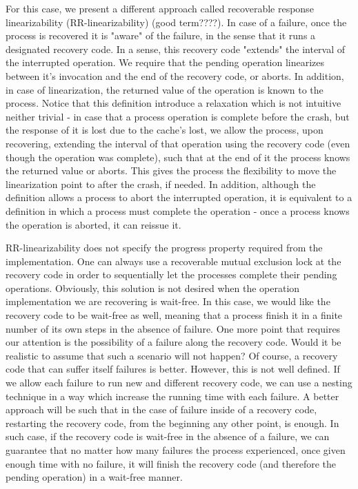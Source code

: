 \documentclass{article}
\begin{document}
For this case, we present a different approach called recoverable response linearizability (RR-linearizability) (good term????). In case of a failure, once the process is recovered it is "aware" of the failure, in the sense that it runs a designated recovery code. In a sense, this recovery code "extends" the interval of the interrupted operation. We require that the pending operation linearizes between it's invocation and the end of the recovery code, or aborts. In addition, in case of linearization, the returned value of the operation is known to the process. Notice that this definition introduce a relaxation which is not intuitive neither trivial - in case that a process operation is complete before the crash, but the response of it is lost due to the cache's lost, we allow the process, upon recovering, extending the interval of that operation using the recovery code (even though the operation was complete), such that at the end of it the process knows the returned value or aborts. This gives the process the flexibility to move the linearization point to after the crash, if needed. In addition, although the definition allows a process to abort the interrupted operation, it is equivalent to a definition in which a process must complete the operation - once a process knows the operation is aborted, it can reissue it.

RR-linearizability does not specify the progress property required from the implementation. One can always use a recoverable mutual exclusion lock at the recovery code in order to sequentially let the processes complete their pending operations. Obviously, this solution is not desired when the operation implementation we are recovering is wait-free. In this case, we would like the recovery code to be wait-free as well, meaning that a process finish it in a finite number of its own steps in the absence of failure. One more point that requires our attention is the possibility of a failure along the recovery code. Would it be realistic to assume that such a scenario will not happen? Of course, a recovery code that can suffer itself failures is better. However, this is not well defined. If we allow each failure to run new and different recovery code, we can use a nesting technique in a way which increase the running time with each failure. A better approach will be such that in the case of failure inside of a recovery code, restarting the recovery code, from the beginning any other point, is enough. In such case, if the recovery code is wait-free in the absence of a failure, we can guarantee that no matter how many failures the process experienced, once given enough time with no failure, it will finish the recovery code (and therefore the pending operation) in a wait-free manner.
\end{document}
